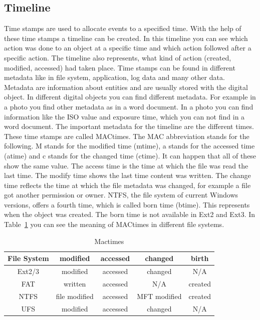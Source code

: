 
\subsection{Timeline}

Time stamps are used to allocate events to a specified time.
With the help of these time stamps a timeline can be created. 
In this timeline you can see which action was done to an object at a specific time and which action followed after a specific action. 
The timeline also  represents, what kind of action (created, modified, accessed) had taken place. 
Time stamps can be found in different metadata like in file system, application, log data and many other data. 
Metadata are information about entities and are usually stored with the digital object. 
In different digital objects you can find different metadata. 
For example in a photo you find other metadata as in a word document. 
In a photo you can find information like the ISO value and exposure time, which you can not find in a word document. 
The important metadata for the timeline are the different times. 
These time stamps are called MACtimes. 
The MAC abbreviation stands for the following. 
M stands for the modified time (mtime), a  stands for the accessed time (atime) and c stands for the changed time (ctime). 
It can happen that all of these show the same value. 
The access time is the time at which the file was read the last time. 
The modify time shows the last time content was written.
The change time reflects the time at which the file metadata was changed, for example a file got another permission or owner. 
NTFS, the file system of current Windows versions, offers a fourth time, which is called born time (btime). 
This represents when the object was created.
The born time is not available in Ext2 and Ext3. 
In Table~\ref{fig:Mactimes} you can see the meaning of MACtimes in different file systems. 

\begin{table}[h]

\begin{tabular}{c|c|c|c|c}
	File System & modified & accessed & changed & birth \\
	\hline \hline
	Ext2/3 & modified & accessed & changed & N/A \\
	\hline
	FAT & written & accessed & N/A & created \\
	\hline
	NTFS & file modified & accessed & MFT modified & created \\
	\hline
	UFS & modified & accessed & changed & N/A \\

\end{tabular}

\caption{Mactimes}
\label{fig:Mactimes}
\end{table}


